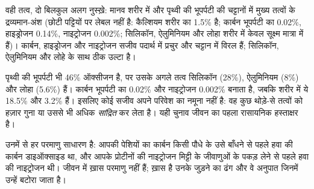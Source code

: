 \begin{omfigure}

{\small वही तत्व, दो बिलकुल अलग नुस्ख़े: मानव शरीर में और पृथ्वी की
भूपर्पटी की चट्टानों में मुख्य तत्वों के द्रव्यमान-अंश (छोटी पट्टियों पर
लेबल नहीं है: कैल्शियम शरीर का 1.5\% है; कार्बन भूपर्पटी का 0.02\%,
हाइड्रोजन 0.14\%, नाइट्रोजन 0.002\%; सिलिकॉन, ऐलुमिनियम और लोहा शरीर में
केवल सूक्ष्म मात्रा में हैं)। कार्बन, हाइड्रोजन और नाइट्रोजन सजीव पदार्थ
में प्रचुर और चट्टान में विरल हैं; सिलिकॉन, ऐलुमिनियम और लोहे के साथ ठीक
उल्टा है।}
\end{omfigure}

\begin{example}[सजीव पदार्थ बनाम चट्टान]\label{ex:g10:chemistry-of-life:crust}
पृथ्वी की भूपर्पटी भी 46\% ऑक्सीजन है, पर उसके अगले तत्व सिलिकॉन (28\%),
ऐलुमिनियम (8\%) और लोहा (5.6\%) हैं। कार्बन भूपर्पटी का 0.02\% और
नाइट्रोजन 0.002\% बनाता है, जबकि शरीर में ये 18.5\% और 3.2\% हैं। इसलिए
कोई सजीव अपने परिवेश का नमूना नहीं है: वह कुछ थोड़े-से तत्वों को हज़ार
गुना या उससे भी अधिक \emph{सांद्रित} कर लेता है। यही चुनाव जीवन का पहला
रासायनिक हस्ताक्षर है।
\end{example}

\begin{remark}[ये परमाणु आते कहाँ से हैं]\label{rem:g10:chemistry-of-life:origin}
उनमें से हर परमाणु साधारण है: आपकी पेशियों का कार्बन किसी पौधे के उसे
बाँधने से पहले हवा की कार्बन डाइऑक्साइड था, और आपके प्रोटीनों की
नाइट्रोजन मिट्टी के जीवाणुओं के पकड़ लेने से पहले हवा की नाइट्रोजन थी।
जीवन में ख़ास परमाणु नहीं हैं; ख़ास है उनके जुड़ने का ढंग और वे अनुपात
जिनमें उन्हें बटोरा जाता है।
\end{remark}

